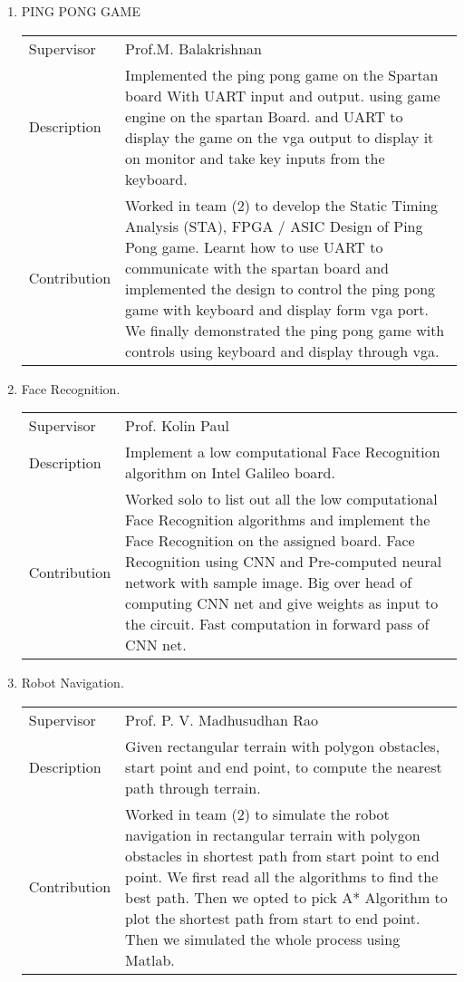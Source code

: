 \documentclass[letterpaper,11pt]{article}
\newlength{\outerbordwidth}
\newcommand{\resheading}[1]{\vspace{8pt}
  \parbox{\textwidth}{\setlength{\FrameSep}{\outerbordwidth}
    \begin{shaded}
\setlength{\fboxsep}{0pt}\framebox[\textwidth][l]{\setlength{\fboxsep}{4pt}\fcolorbox{shadecolorB}{shadecolorB}{\textbf{\sffamily{\mbox{~}\makebox[6.762in][l]{\large #1} \vphantom{p\^{E}}}}}}
    \end{shaded}
  }\vspace{-5pt}
}
\begin{document}
\newpage
\resheading{PROJECTS}

\begin{enumerate}
 \item PING PONG GAME\\
 \begin{center}
 \begin{tabular}{p{3cm} p{13cm} }
 Supervisor& Prof.M. Balakrishnan  \\
 Description& Implemented the ping pong game on the Spartan board With UART input and output. using game engine on the spartan Board. and UART to display the game on the vga output to display it on monitor and take key inputs from the keyboard. \\
Contribution& Worked in team (2) to develop the Static Timing Analysis (STA), FPGA / ASIC Design of Ping Pong game. Learnt how to use UART to communicate with the spartan board and implemented the design to control the ping pong game
with keyboard and display form vga port. We finally demonstrated the ping pong game with controls using keyboard
and display through vga.
\end{tabular}
\end{center}

 \item Face Recognition.
 \begin{center}
 \begin{tabular}{p{3cm} p{13cm} }
 Supervisor& Prof. Kolin Paul\\
 Description& Implement a low computational Face Recognition algorithm on Intel Galileo board.\\
Contribution& Worked solo to list out all the low computational Face Recognition algorithms and implement the Face Recognition on the assigned board. Face Recognition using CNN and Pre-computed neural network with sample image. Big over
head of computing CNN net and give weights as input to the circuit. Fast computation in forward pass of CNN net.\\
\end{tabular}
\end{center}

\item Robot Navigation.
 \begin{center}
 \begin{tabular}{p{3cm} p{13cm} }
 Supervisor& Prof. P. V. Madhusudhan Rao\\
 Description& Given rectangular terrain with polygon obstacles, start point and end point, to compute the nearest path through terrain.\\
Contribution&Worked in team (2) to simulate the robot navigation in rectangular terrain with polygon obstacles in shortest path from start point to end point. We first read all the algorithms to find the best path. Then we opted to pick A*
Algorithm to plot the shortest path from start to end point. Then we simulated the whole process using Matlab.\\
\end{tabular}
\end{center}


\end{enumerate}
\end{document}
